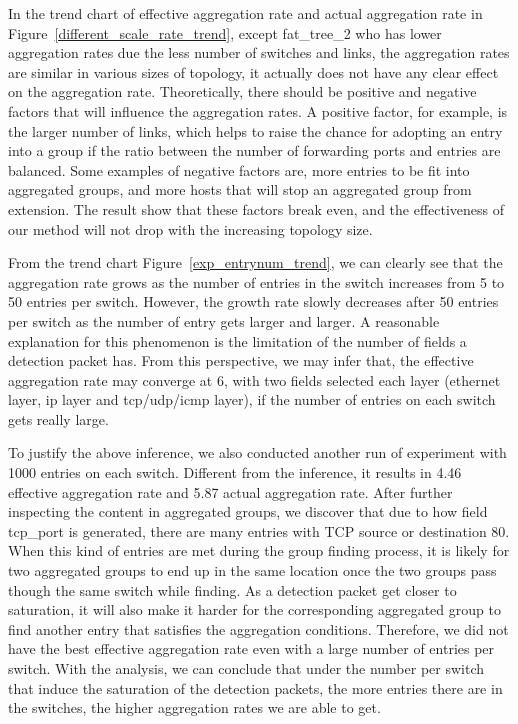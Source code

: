 In the trend chart of effective aggregation rate and actual aggregation rate in Figure~\ref{different_scale_rate_trend}, except fat\_tree\_2 who has lower aggregation rates due the less number of switches and links, the aggregation rates are similar in various sizes of topology, it actually does not have any clear effect on the aggregation rate. Theoretically, there should be positive and negative factors that will influence the aggregation rates. A positive factor, for example, is the larger number of links, which helps to raise the chance for adopting an entry into a group if the ratio between the number of forwarding ports and entries are balanced. Some examples of negative factors are, more entries to be fit into aggregated groups, and more hosts that will stop an aggregated group from extension. The result show that these factors break even, and the effectiveness of our method will not drop with the increasing topology size.

From the trend chart Figure~\ref{exp_entrynum_trend}, we can clearly see that the aggregation rate grows as the number of entries in the switch increases from 5 to 50 entries per switch. However, the growth rate slowly decreases after 50 entries per switch as the number of entry gets larger and larger. A reasonable explanation for this phenomenon is the limitation of the number of fields a detection packet has. From this perspective, we may infer that, the effective aggregation rate may converge at 6, with two fields selected each layer (ethernet layer, ip layer and tcp/udp/icmp layer), if the number of entries on each switch gets really large.

To justify the above inference, we also conducted another run of experiment with 1000 entries on each switch. Different from the inference, it results in 4.46 effective aggregation rate and 5.87 actual aggregation rate. After further inspecting the content in aggregated groups, we discover that due to how field tcp\_port is generated, there are many entries with TCP source or destination 80. When this kind of entries are met during the group finding process, it is likely for two aggregated groups to end up in the same location once the two groups pass though the same switch while finding. As a detection packet get closer to saturation, it will also make it harder for the corresponding aggregated group to find another entry that satisfies the aggregation conditions. Therefore, we did not have the best effective aggregation rate even with a large number of entries per switch. With the analysis, we can conclude that under the number per switch that induce the saturation of the detection packets, the more entries there are in the switches, the higher aggregation rates we are able to get.